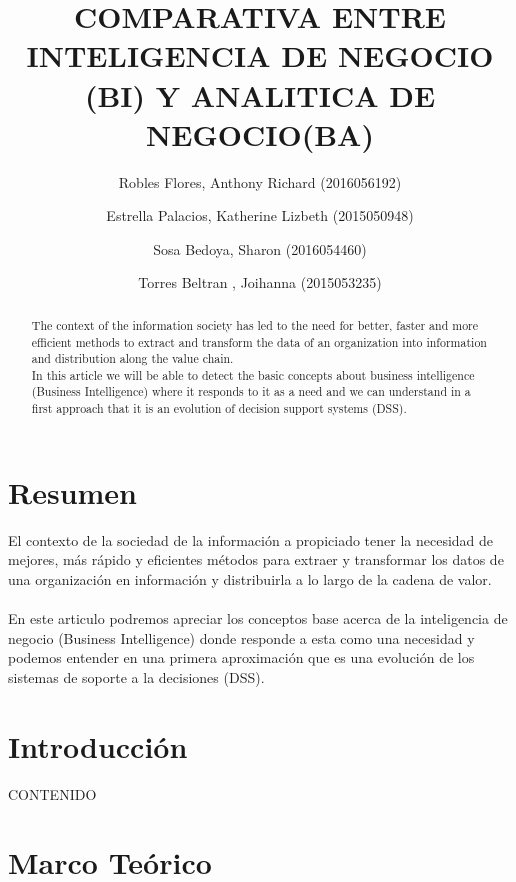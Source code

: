 \documentclass[preprint,12pt]{elsarticle}
\begin{document}
	
	\begin{frontmatter}

		\title{\huge  COMPARATIVA ENTRE INTELIGENCIA DE NEGOCIO (BI) Y ANALITICA DE NEGOCIO(BA) }
		\author{Robles Flores, Anthony Richard	                (2016056192)}
		\author{Estrella Palacios, Katherine Lizbeth			(2015050948)}
		\author{Sosa Bedoya, Sharon					(2016054460)}
		\author{Torres Beltran , Joihanna				(2015053235)}
		\address{Tacna, Perú}
		


\begin{abstract}
The context of the information society has led to the need for better, faster and more efficient methods 
to extract and transform the data of an organization into information and distribution along the value chain.
\\
In this article we will be able to detect the basic concepts about business intelligence (Business Intelligence) 
where it responds to it as a need and we can understand in a first approach that it is an evolution of decision 
support systems (DSS).
\end{abstract}


\end{frontmatter}

\section{Resumen}
El contexto de la sociedad de la información a propiciado tener la necesidad de mejores, más rápido y eficientes 
métodos para extraer y transformar los datos de una organización en información y distribuirla a lo largo de la 
cadena de valor.
\\
\\
En este articulo podremos apreciar los conceptos base acerca de la inteligencia de negocio (Business Intelligence)
 donde responde a esta como una necesidad y podemos entender en una primera aproximación que es una 
evolución de los sistemas de soporte a la decisiones (DSS).


\section{Introducción}
CONTENIDO


\section{Marco Teórico}
\end{document}
